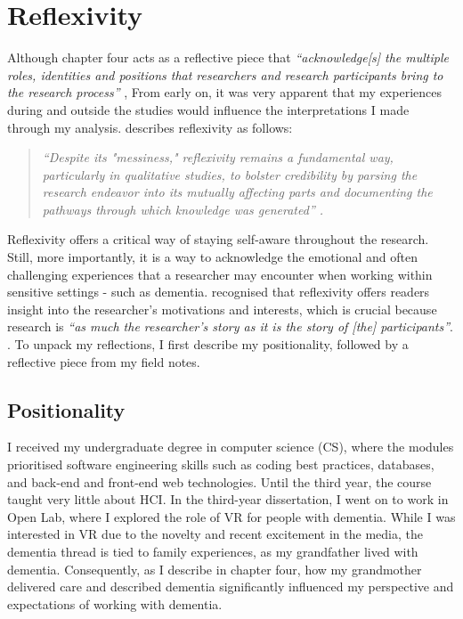 \newpage
\section{Reflexivity}
\label{Method:Reflectivity}
Although chapter four acts as a reflective piece that \textit{``acknowledge[s] the multiple roles, identities and positions that researchers and research participants bring to the research process''} \citep[p.395]{milner2007race},  From early on, it was very apparent that my experiences during and outside the studies would influence the interpretations I made through my analysis. \cite{probst2015eye} describes reflexivity as follows:
\begin{quote}
\textit{``Despite its "messiness," reflexivity remains a fundamental way, particularly in qualitative studies, to bolster credibility by parsing the research endeavor into its mutually affecting parts and documenting the pathways through which knowledge was generated'' \citep{probst2015eye}.
}\end{quote}

Reflexivity offers a critical way of staying self-aware throughout the research. Still, more importantly, it is a way to acknowledge the emotional and often challenging experiences that a researcher may encounter when working within sensitive settings - such as dementia. \cite{corlett2018reflexivity} recognised that reflexivity offers readers insight into the researcher's motivations and interests, which is crucial because research is \textit{``as much the researcher's story as it is the story of [the] participants''}. . To unpack my reflections, I first describe my positionality, followed by a reflective piece from my field notes.

\subsection{Positionality}
\label{Method:Positionality}
I received my undergraduate degree in computer science (CS), where the modules prioritised software engineering skills such as coding best practices, databases, and back-end and front-end web technologies. Until the third year, the course taught very little about HCI. In the third-year dissertation, I went on to work in Open Lab, where I explored the role of VR for people with dementia. While I was interested in VR due to the novelty and recent excitement in the media, the dementia thread is tied to family experiences, as my grandfather lived with dementia. Consequently, as I describe in chapter four, how my grandmother delivered care and described dementia significantly influenced my perspective and expectations of working with dementia. 

